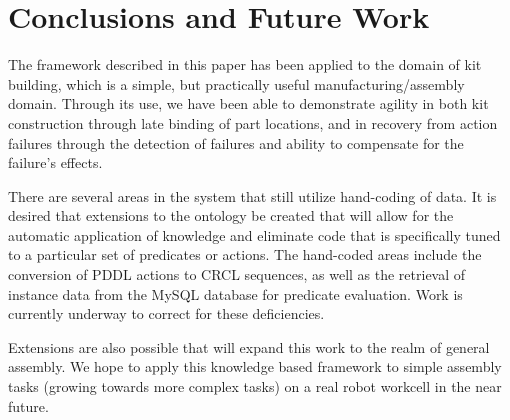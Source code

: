 \section{Conclusions and Future Work}
\label{sect:future}
The framework described in this paper has been applied to the domain of kit building, which is a simple, but practically useful manufacturing/assembly domain. Through its use, we have been able to demonstrate agility in both kit construction through late binding of part locations, and in recovery from action failures through the detection of failures and ability to compensate for the failure's effects.

There are several areas in the system that still utilize hand-coding of data. It is desired that extensions to the ontology be created that will allow for the automatic application of knowledge and eliminate code that is specifically tuned to a particular set of predicates or actions. The hand-coded areas include the conversion of PDDL actions to CRCL sequences, as well as the retrieval of instance data from the MySQL database for predicate evaluation. Work is currently underway to correct for these deficiencies. 

Extensions are also possible that will expand this work to the realm of general assembly. We hope to apply this knowledge based framework to simple assembly tasks (growing towards more complex tasks) on a real robot workcell in the near future. 
